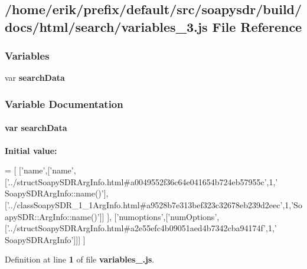 \subsection{/home/erik/prefix/default/src/soapysdr/build/docs/html/search/variables\+\_\+3.js File Reference}
\label{variables__3_8js}
\subsubsection*{Variables}
\begin{DoxyCompactItemize}
\item 
var {\bf search\+Data}
\end{DoxyCompactItemize}


\subsubsection{Variable Documentation}
\paragraph[{search\+Data}]{\setlength{\rightskip}{0pt plus 5cm}var search\+Data}\label{variables__3_8js_ad01a7523f103d6242ef9b0451861231e}
{\bfseries Initial value\+:}
\begin{DoxyCode}
=
[
  [\textcolor{stringliteral}{'name'},[\textcolor{stringliteral}{'name'},[\textcolor{stringliteral}{'../structSoapySDRArgInfo.html#a0049552f36c64e041654b724eb57955c'},1,\textcolor{stringliteral}{'
      SoapySDRArgInfo::name()'}],[\textcolor{stringliteral}{'../classSoapySDR\_1\_1ArgInfo.html#a9528b7e313bef323c32678eb239d2eec'},1,\textcolor{stringliteral}{'SoapySDR::ArgInfo::name()'}]]
      ],
  [\textcolor{stringliteral}{'numoptions'},[\textcolor{stringliteral}{'numOptions'},[\textcolor{stringliteral}{'../structSoapySDRArgInfo.html#a2e55efc4b09051aed4b7342cba94174f'},1,\textcolor{stringliteral}{'
      SoapySDRArgInfo'}]]]
]
\end{DoxyCode}


Definition at line {\bf 1} of file {\bf variables\+\_.\+js}.

